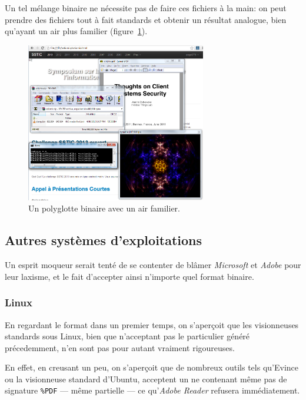 Un tel mélange binaire ne nécessite pas de faire ces fichiers à la main: on peut prendre des fichiers tout à fait standards et obtenir un résultat analogue, bien qu'ayant un air plus familier (figure~\ref{fig:albertini:sssticmix}).

\begin{figure}[p]
  \centering
  \includegraphics[width=0.7\textwidth]{albertini/img/sssticmix}
  \caption{Un polyglotte binaire avec un air familier.}
  \label{fig:albertini:sssticmix}
\end{figure}

\subsection{Autres systèmes d'exploitations}

Un esprit moqueur serait tenté de se contenter de blâmer \emph{Microsoft} et \emph{Adobe} pour leur laxisme, et le fait d'accepter ainsi n'importe quel format binaire.

\subsubsection{Linux}

En regardant le format \PDF dans un premier temps, on s'aperçoit que les visionneuses \PDF standards sous Linux, bien que n'acceptant pas le \PDF particulier généré précedemment, n'en sont pas pour autant vraiment rigoureuses.

En effet, en creusant un peu, on s'aperçoit que de nombreux outils \PDF tels qu'Evince ou la visionneuse standard d'Ubuntu, acceptent un \PDF ne contenant même pas de signature \texttt{\%PDF} --- même partielle --- ce qu'\emph{Adobe Reader} refusera immédiatement.


